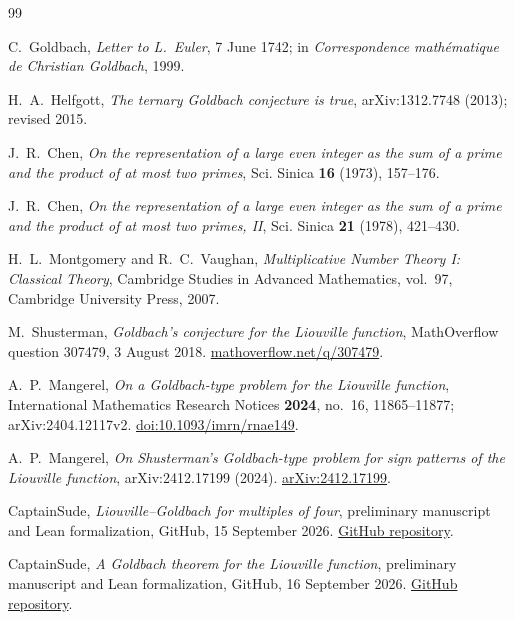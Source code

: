\documentclass[11pt,a4paper]{ctexart}
\theoremstyle{plain}
\theoremstyle{definition}
\begin{document}
\begin{thebibliography}{99}
\small
\setlength{\itemsep}{3pt}

C.~Goldbach,
\emph{Letter to L.~Euler}, 7 June 1742;
in \emph{Correspondence math\'ematique de Christian Goldbach}, 1999.

H.~A.~Helfgott,
\emph{The ternary Goldbach conjecture is true},
arXiv:1312.7748 (2013); revised 2015.

J.~R.~Chen,
\emph{On the representation of a large even integer as the sum of a prime and the product of at most two primes},
Sci. Sinica \textbf{16} (1973), 157--176.

J.~R.~Chen,
\emph{On the representation of a large even integer as the sum of a prime and the product of at most two primes, II},
Sci. Sinica \textbf{21} (1978), 421--430.

H.~L.~Montgomery and R.~C.~Vaughan,
\emph{Multiplicative Number Theory I: Classical Theory},
Cambridge Studies in Advanced Mathematics, vol.~97, Cambridge University Press, 2007.

M.~Shusterman,
\emph{Goldbach's conjecture for the Liouville function},
MathOverflow question 307479, 3 August 2018.
\href{https://mathoverflow.net/q/307479}{mathoverflow.net/q/307479}.

A.~P.~Mangerel,
\emph{On a Goldbach-type problem for the Liouville function},
International Mathematics Research Notices \textbf{2024}, no.~16, 11865--11877;
arXiv:2404.12117v2.
\href{https://doi.org/10.1093/imrn/rnae149}{doi:10.1093/imrn/rnae149}.

A.~P.~Mangerel,
\emph{On Shusterman's Goldbach-type problem for sign patterns of the Liouville function},
arXiv:2412.17199 (2024).
\href{https://arxiv.org/abs/2412.17199}{arXiv:2412.17199}.

CaptainSude,
\emph{Liouville--Goldbach for multiples of four},
preliminary manuscript and Lean formalization, GitHub, 15 September 2026.
\href{https://github.com/CaptainSude/Liouville-Goldbach-Multiples-of-Four}{GitHub repository}.

CaptainSude,
\emph{A Goldbach theorem for the Liouville function},
preliminary manuscript and Lean formalization, GitHub, 16 September 2026.
\href{https://github.com/CaptainSude/Liouville-Goldbach}{GitHub repository}.


\end{thebibliography}
\end{document}
